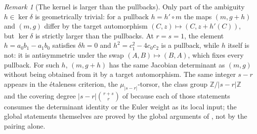 \documentclass[11pt,reqno]{amsart}
\theoremstyle{definition}
\theoremstyle{remark}
\newtheorem{remark}[remark]{Remark}
\newcommand{\Z}{\mathbb Z}
\newcommand{\abs}[1]{\lvert #1\rvert}
\begin{document}
\begin{remark}[The kernel is larger than the pullbacks]
\label{rem:kernel}
Only part of the ambiguity $h\in\ker\delta$ is geometrically
trivial: for a pullback $h=h'\circ m$ the maps $(m,g+h)$ and
$(m,g)$ differ by the target automorphism
$(C,z)\mapsto(C,z+h'(C))$, but $\ker\delta$ is strictly larger than
the pullbacks.  At $r=s=1$, the element $h=a_0b_1-a_1b_0$ satisfies
$\delta h=0$ and $h^2=c_1^2-4c_0c_2$ is a pullback, while $h$ itself
is not: it is antisymmetric under the swap
$(A,B)\mapsto(B,A)$, which fixes every pullback.  For such
$h$, $(m,g+h)$ has the same Jacobian determinant as $(m,g)$ without
being obtained from it by a target automorphism.  The same integer
$s-r$ appears in the \'etaleness criterion, the
$\mu_{\abs{s-r}}$-torsor, the class group
$\Z/\abs{s-r}\Z$ and the covering degree
$\abs{s-r}\binom{r+s}{r}$ of \cite{DDAS} because each of those
statements consumes the determinant identity or the Euler weight as
its local input; the global statements themselves are proved by the
global arguments of \cite{DDAS}, not by the pairing alone.
\end{remark}
\end{document}
